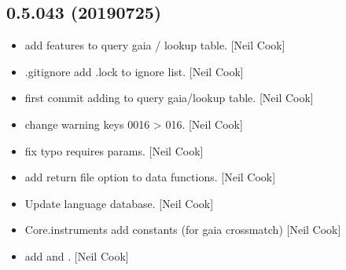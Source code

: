\documentclass[a4paper,10pt,english]{report}
\begin{document}
\subsection{0.5.043 (2019\sphinxhyphen{}07\sphinxhyphen{}25)}
\label{\detokenize{misc/changelog:id118}}\begin{itemize}
\item {} 
 \sphinxhyphen{} add features to query gaia / lookup table.
{[}Neil Cook{]}

\item {} 
.gitignore \sphinxhyphen{} add .lock to ignore list. {[}Neil Cook{]}

\item {} 
 \sphinxhyphen{} first commit \textendash{} adding to query
gaia/lookup table. {[}Neil Cook{]}

\item {} 
 \sphinxhyphen{} change warning keys 0016 \textendash{}\textgreater{} 016.
{[}Neil Cook{]}

\item {} 
 \sphinxhyphen{} fix typo  requires params. {[}Neil
Cook{]}

\item {} 
 \sphinxhyphen{} add return file option to data functions. {[}Neil Cook{]}

\item {} 
Update language database. {[}Neil Cook{]}

\item {} 
Core.instruments \sphinxhyphen{} add  constants (for gaia crossmatch) {[}Neil
Cook{]}

\item {} 
 \sphinxhyphen{} add  and . {[}Neil Cook{]}

\end{itemize}
\end{document}
